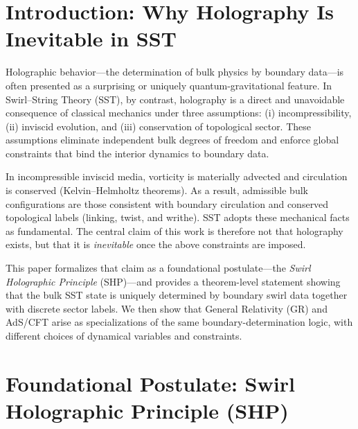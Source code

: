 \documentclass[11pt]{article}
\begin{document}

    \section{Introduction: Why Holography Is Inevitable in SST}

    Holographic behavior---the determination of bulk physics by boundary data---is
    often presented as a surprising or uniquely quantum-gravitational feature.
    In Swirl--String Theory (SST), by contrast, holography is a direct and unavoidable
    consequence of classical mechanics under three assumptions: (i) incompressibility,
    (ii) inviscid evolution, and (iii) conservation of topological sector.
    These assumptions eliminate independent bulk degrees of freedom and enforce
    global constraints that bind the interior dynamics to boundary data.

    In incompressible inviscid media, vorticity is materially advected and circulation
    is conserved (Kelvin--Helmholtz theorems). As a result, admissible bulk configurations
    are those consistent with boundary circulation and conserved topological labels
    (linking, twist, and writhe). SST adopts these mechanical facts as fundamental.
    The central claim of this work is therefore not that holography exists, but that
    it is \emph{inevitable} once the above constraints are imposed.

    This paper formalizes that claim as a foundational postulate---the
    \emph{Swirl Holographic Principle} (SHP)---and provides a theorem-level statement
    showing that the bulk SST state is uniquely determined by boundary swirl data
    together with discrete sector labels. We then show that General Relativity (GR)
    and AdS/CFT arise as specializations of the same boundary-determination logic,
    with different choices of dynamical variables and constraints.

    \section{Foundational Postulate: Swirl Holographic Principle (SHP)}
\end{document}
